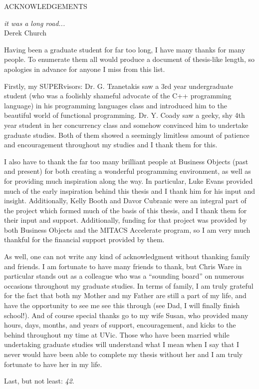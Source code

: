 \newpage
{}

\begin{center}
ACKNOWLEDGEMENTS
\end{center}

\begin{flushright}
\textit{it was a long road...}
\\
Derek Church \cite{Church06}\\
\end{flushright}

Having been a graduate student for far too long, I have many thanks for many people.  To enumerate them all would produce a document of thesis-like length, so apologies in advance for anyone I miss from this list.

Firstly, my SUPERvisors: Dr. G. Tzanetakis saw a 3rd year undergraduate student (who was a foolishly shameful advocate of the C++ programming language) in his programming languages class and introduced him to the beautiful world of functional programming.  Dr. Y. Coady saw a geeky, shy 4th year student in her concurrency class and somehow convinced him to undertake graduate studies.  Both of them showed a seemingly limitless amount of patience and encouragement throughout my studies and I thank them for this.

I also have to thank the far too many brilliant people at Business Objects (past and present) for both creating a wonderful programming environment, as well as for providing much inspiration along the way.  In particular, Luke Evans provided much of the early inspiration behind this thesis and I thank him for his input and insight.  Additionally, Kelly Booth and Davor Cubranic were an integral part of the project which formed much of the basis of this thesis, and I thank them for their input and support.  Additionally, funding for that project was provided by both Business Objects and the MITACS Accelerate program, so I am very much thankful for the financial support provided by them.

As well, one can not write any kind of acknowledgment without thanking family and friends.  I am fortunate to have many friends to thank, but Chris Ware in particular stands out as a colleague who was a ``sounding board'' on numerous occasions throughout my graduate studies.  In terms of family, I am truly grateful for the fact that both my Mother and my Father are still a part of my life, and have the opportunity to see me see this through (see Dad, I will finally finish school!).  And of course special thanks go to my wife Susan, who provided many hours, days, months, and years of support, encouragement, and kicks to the behind throughout my time at UVic.  Those who have been married while undertaking graduate studies will understand what I mean when I say that I never would have been able to complete my thesis without her and I am truly fortunate to have her in my life.

Last, but not least: \emph{42}.
